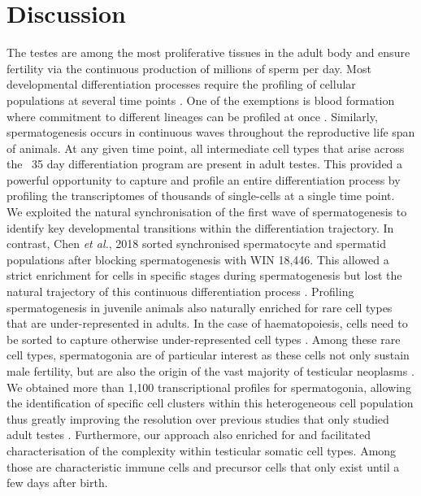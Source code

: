 
\section{Discussion}

The testes are among the most proliferative tissues in the adult body and ensure fertility via the continuous production of millions of sperm per day. 
Most developmental differentiation processes require the profiling of cellular populations at several time points \citep{Kernfeld2018, Scialdone2016, Wagner2018}. 
One of the exemptions is blood formation where commitment to different lineages can be profiled at once \citep{Dahlin2018}. 
Similarly, spermatogenesis occurs in continuous waves throughout the reproductive life span of animals. 
At any given time point, all intermediate cell types that arise across the ~35 day differentiation program are present in adult testes. 
This provided a powerful opportunity to capture and profile an entire differentiation process by profiling the transcriptomes of thousands of single-cells at a single time point. \\

We exploited the natural synchronisation of the first wave of spermatogenesis to identify key developmental transitions within the differentiation trajectory. 
In contrast, Chen \emph{et al.}, 2018 sorted synchronised spermatocyte and spermatid populations after blocking spermatogenesis with WIN 18,446. 
This allowed a strict enrichment for cells in specific stages during spermatogenesis but lost the natural trajectory of this continuous differentiation process \citep{Chen2018}. 
Profiling spermatogenesis in juvenile animals also naturally enriched for rare cell types that are under-represented in adults. 
In the case of haematopoiesis, cells need to be sorted to capture otherwise under-represented cell types \citep{Dahlin2018}. 
Among these rare cell types, spermatogonia are of particular interest as these cells not only sustain male fertility, but are also the origin of the vast majority of testicular neoplasms \citep{Bosl1997}. 
We obtained more than 1,100 transcriptional profiles for spermatogonia, allowing the identification of specific cell clusters within this heterogeneous cell population thus greatly improving the resolution over previous studies that only studied adult testes \citep{Lukassen2018}. 
Furthermore, our approach also enriched for and facilitated characterisation of the complexity within testicular somatic cell types. 
Among those are characteristic immune cells and precursor cells that only exist until a few days after birth.\\

